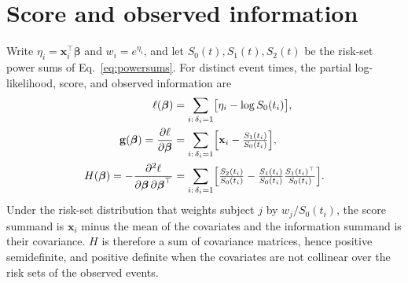\documentclass[11pt,a4paper]{article}
\begin{document}
\appendix
\section{Score and observed information}
\label{app:derivation}

Write $\eta_i = \mathbf{x}_i^\top\boldsymbol\beta$ and $w_i = e^{\eta_i}$, and let
$S_0(t), S_1(t), S_2(t)$ be the risk-set power sums of
Eq.~\eqref{eq:powersums}. For distinct event times, the partial log-likelihood,
score, and observed information are
\begin{align}
  \ell(\boldsymbol\beta) &= \sum_{i:\,\delta_i=1}
      \bigl[\eta_i - \log S_0(t_i)\bigr], \\
  \mathbf{g}(\boldsymbol\beta)
      = \frac{\partial\ell}{\partial\boldsymbol\beta}
      &= \sum_{i:\,\delta_i=1}
         \Bigl[\mathbf{x}_i - \tfrac{S_1(t_i)}{S_0(t_i)}\Bigr], \\
  H(\boldsymbol\beta)
      = -\frac{\partial^2\ell}
              {\partial\boldsymbol\beta\,\partial\boldsymbol\beta^\top}
      &= \sum_{i:\,\delta_i=1}
         \Bigl[\tfrac{S_2(t_i)}{S_0(t_i)}
               - \tfrac{S_1(t_i)}{S_0(t_i)}\tfrac{S_1(t_i)^\top}{S_0(t_i)}
         \Bigr].
\end{align}
Under the risk-set distribution that weights subject $j$ by $w_j / S_0(t_i)$,
the score summand is $\mathbf{x}_i$ minus the mean of the covariates and the
information summand is their covariance. $H$ is therefore a sum of covariance
matrices, hence positive semidefinite, and positive definite when the
covariates are not collinear over the risk sets of the observed events.
\end{document}
